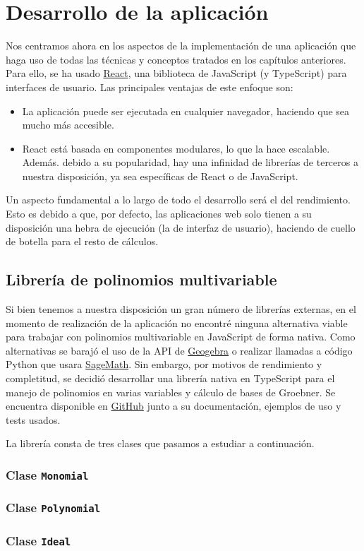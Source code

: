 
\chapter{Desarrollo de la aplicación}
Nos centramos ahora en los aspectos de la implementación de una aplicación que haga uso de todas las técnicas y conceptos tratados en los capítulos anteriores. Para ello, se ha usado \href{https://es.reactjs.org/}{React}, una biblioteca de JavaScript (y TypeScript) para interfaces de usuario. Las principales ventajas de este enfoque son:
\begin{itemize}
    \item La aplicación puede ser ejecutada en cualquier navegador, haciendo que sea mucho más accesible.
    \item React está basada en componentes modulares, lo que la hace escalable. Además. debido a su popularidad, hay una infinidad de librerías de terceros a nuestra disposición, ya sea específicas de React o de JavaScript.
\end{itemize}

Un aspecto fundamental a lo largo de todo el desarrollo será el del rendimiento. Esto es debido a que, por defecto, las aplicaciones web solo tienen a su disposición una hebra de ejecución (la de interfaz de usuario), haciendo de cuello de botella para el resto de cálculos.

\section{Librería de polinomios multivariable}
Si bien tenemos a nuestra disposición un gran número de librerías externas, en el momento de realización de la aplicación no encontré ninguna alternativa viable para trabajar con polinomios multivariable en JavaScript de forma nativa. Como alternativas se barajó el uso de la API de \href{https://wiki.geogebra.org/en/Reference:GeoGebra_Apps_API}{Geogebra} o realizar llamadas a código Python que usara \href{https://www.sagemath.org/}{SageMath}. Sin embargo, por motivos de rendimiento y completitud, se decidió desarrollar una librería nativa en TypeScript para el manejo de polinomios en varias variables y cálculo de bases de Groebner. Se encuentra disponible en \href{https://github.com/Daniel2000815/multivariate-polynomial}{GitHub} junto a su documentación, ejemplos de uso y tests usados.\newline

La librería consta de tres clases que pasamos a estudiar a continuación.

\subsection{Clase \texttt{Monomial}}

\subsection{Clase \texttt{Polynomial}}

\subsection{Clase \texttt{Ideal}}